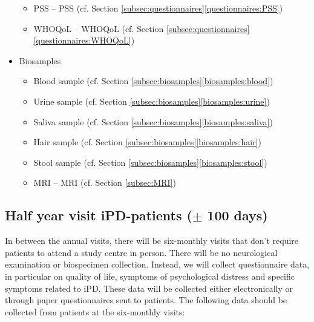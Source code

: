 \begin{itemize}[noitemsep,topsep=0pt]
\begin{itemize}[noitemsep,topsep=0pt]
\item \acl{PSS} -- \acs{PSS} (cf. Section \ref{subsec:questionnaires}\ref{questionnaires:PSS})
\item \acl{WHOQoL} -- \acs{WHOQoL} (cf. Section \ref{subsec:questionnaires}\ref{questionnaires:WHOQoL})
\end{itemize}
\item Biosamples
\begin{itemize}[noitemsep,topsep=0pt]
\item Blood sample (cf. Section \ref{subsec:biosamples}\ref{biosamples:blood})
\item Urine sample (cf. Section \ref{subsec:biosamples}\ref{biosamples:urine})
\item Saliva sample (cf. Section \ref{subsec:biosamples}\ref{biosamples:saliva})
\item Hair sample (cf. Section \ref{subsec:biosamples}\ref{biosamples:hair})
\item Stool sample (cf. Section \ref{subsec:biosamples}\ref{biosamples:stool})
\item \acl{MRI} -- \acs{MRI} (cf. Section \ref{subsec:MRI}) 
\end{itemize}
\end{itemize}

\subsection{Half year visit \ac{iPD}-patients ($\pm$ 100 days)}
In between the annual visits, there will be six-monthly visits that don't require patients to attend a study centre in person. There will be no neurological examination or biospecimen collection. Instead, we will collect questionnaire data, in particular on quality of life, symptoms of psychological distress and specific symptoms related to \ac{iPD}. These data will be collected either electronically or through paper questionnaires sent to patients. The following data should be collected from patients at the six-monthly visits:

